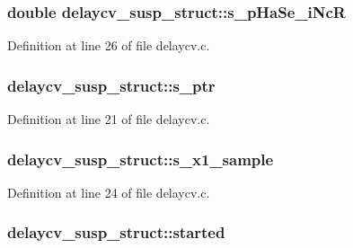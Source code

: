 \subsubsection[{\texorpdfstring{s\+\_\+p\+Ha\+Se\+\_\+i\+NcR}{s_pHaSe_iNcR}}]{\setlength{\rightskip}{0pt plus 5cm}double delaycv\+\_\+susp\+\_\+struct\+::s\+\_\+p\+Ha\+Se\+\_\+i\+NcR}\hypertarget{structdelaycv__susp__struct_af7f6967009dca96c87d66a0dea636a90}{}\label{structdelaycv__susp__struct_af7f6967009dca96c87d66a0dea636a90}


Definition at line 26 of file delaycv.\+c.

\subsubsection[{\texorpdfstring{s\+\_\+ptr}{s_ptr}}]{ delaycv\+\_\+susp\+\_\+struct\+::s\+\_\+ptr}\hypertarget{structdelaycv__susp__struct_a26c700f1d49d396d6a8cdbb676fb8ffd}{}\label{structdelaycv__susp__struct_a26c700f1d49d396d6a8cdbb676fb8ffd}


Definition at line 21 of file delaycv.\+c.

\subsubsection[{\texorpdfstring{s\+\_\+x1\+\_\+sample}{s_x1_sample}}]{ delaycv\+\_\+susp\+\_\+struct\+::s\+\_\+x1\+\_\+sample}\hypertarget{structdelaycv__susp__struct_ac02932713af9536ab6919092ea812e0f}{}\label{structdelaycv__susp__struct_ac02932713af9536ab6919092ea812e0f}


Definition at line 24 of file delaycv.\+c.

\subsubsection[{\texorpdfstring{started}{started}}]{ delaycv\+\_\+susp\+\_\+struct\+::started}\hypertarget{structdelaycv__susp__struct_af5e609da5738bf11b247b48472141aa3}{}\label{structdelaycv__susp__struct_af5e609da5738bf11b247b48472141aa3}


